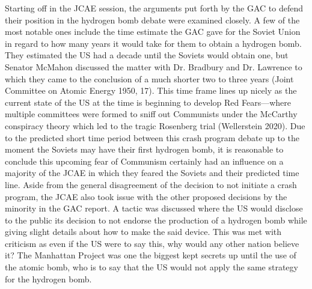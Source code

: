 \documentclass[12pt]{turabian-researchpaper}
\begin{document}
Starting off in the JCAE session, the arguments put forth by the GAC to defend their position in the hydrogen bomb debate were examined closely. A few of the most notable ones include the time estimate the GAC gave for the Soviet Union in regard to how many years it would take for them to obtain a hydrogen bomb. They estimated the US had a decade until the Soviets would obtain one, but Senator McMahon discussed the matter with Dr. Bradbury and Dr. Lawrence to which they came to the conclusion of a much shorter two to three years (Joint Committee on Atomic Energy 1950, 17). This time frame lines up nicely as the current state of the US at the time is beginning to develop Red Fears—where multiple committees were formed to sniff out Communists under the McCarthy conspiracy theory which led to the tragic Rosenberg trial (Wellerstein 2020). Due to the predicted short time period between this crash program debate up to the moment the Soviets may have their first hydrogen bomb, it is reasonable to conclude this upcoming fear of Communism certainly had an influence on a majority of the JCAE in which they feared the Soviets and their predicted time line. Aside from the general disagreement of the decision to not initiate a crash program, the JCAE also took issue with the other proposed decisions by the minority in the GAC report. A tactic was discussed where the US would disclose to the public its decision to not endorse the production of a hydrogen bomb while giving slight details about how to make the said device. This was met with criticism as even if the US were to say this, why would any other nation believe it? The Manhattan Project was one the biggest kept secrets up until the use of the atomic bomb, who is to say that the US would not apply the same strategy for the hydrogen bomb. 
	
\end{document}
